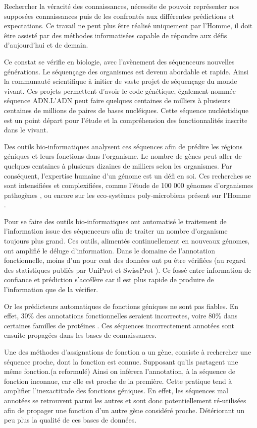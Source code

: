 Rechercher la véracité des connaissances, nécessite de pouvoir représenter nos supposées connaissances puis de les confrontés aux différentes prédictions et expectations. Ce travail ne peut plus être réalisé uniquement par l'Homme, il doit être assisté par des méthodes informatisées capable de répondre aux défis d'aujourd'hui et de demain.

Ce constat se vérifie en biologie, avec l'avènement des séquenceurs nouvelles générations. Le séquençage des organismes est devenu abordable et rapide. Ainsi la communauté scientifique à initier de vaste projet de séquençage du monde vivant. Ces projets permettent d'avoir le code génétique, également nommée séquence \gls{ADN}.L'ADN peut faire quelques centaines de milliers à plusieurs centaines de millions de paires de bases nucléiques. Cette séquence nucléotidique est un point départ pour l'étude et la compréhension des fonctionnalités inscrite dans le vivant.

Des outils bio-informatiques analysent ces séquences afin de prédire les régions géniques et leurs fonctions dans l'organisme. Le nombre de gènes peut aller de quelques centaines à plusieurs dizaines de milliers selon les organismes. Par conséquent, l'expertise humaine d'un génome est un défi en soi. Ces recherches se sont intensifiées et complexifiées, comme l'étude de 100 000 génomes d'organismes pathogènes \citep[voir][]{100kfoodborne}, ou encore sur les eco-systèmes poly-microbiens présent sur l'Homme \citep[voir][]{hmp}.

Pour se faire des outils bio-informatiques ont automatisé le traitement de l'information issue des séquenceurs afin de traiter un nombre d'organisme toujours plus grand. Ces outils, alimentés continuellement en nouveaux génomes, ont amplifié le déluge d'information. Dans le domaine de l'annotation fonctionnelle, moins d'un pour cent des données ont pu être vérifiées (au regard des statistiques publiés par UniProt et SwissProt \parencites{uniprot_stat}{expasy_stat} ). Ce fossé entre information de confiance et prédiction s'accélère car il est plus rapide de produire de l'information que de la vérifier.

Or les prédicteurs automatiques de fonctions géniques ne sont pas fiables. En effet, 30\% des annotations fonctionnelles seraient incorrectes, voire 80\% dans certaines familles de protéines \parencites{devos2001intrinsic}{schnoes2009annotation}. Ces séquences incorrectement annotées sont ensuite propagées dans les bases de connaissances.

Une des méthodes d'assignations de fonction a un gène, consiste à rechercher une séquence proche, dont la fonction est connue. Supposant qu'ils partagent une même fonction.(a reformulé) Ainsi on inférera l'annotation, à la séquence de fonction inconnue, car elle est proche de la première. Cette pratique tend à amplifier l'inexactitude des fonctions géniques. En effet, les séquences mal annotées se retrouvent parmi les autres et sont donc potentiellement ré-utilisées  afin de propager une fonction d'un autre gène considéré proche. Détériorant un peu plus la qualité de ces bases de données.

